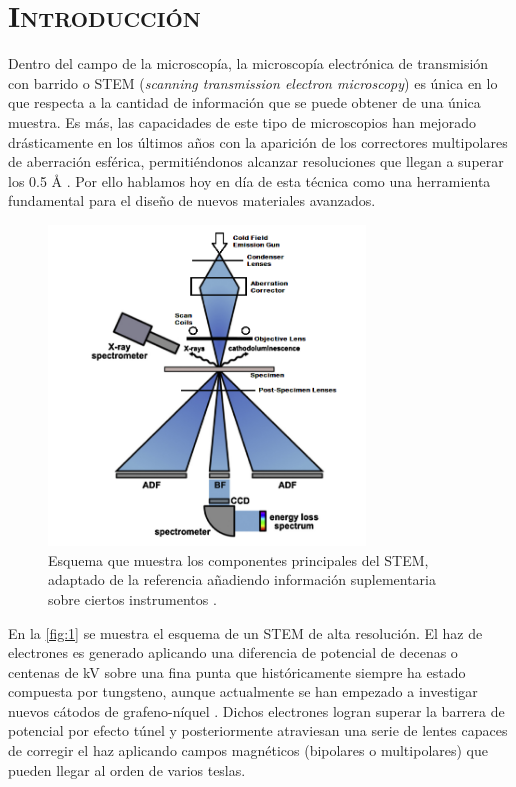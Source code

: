 \section*{\centering\scshape\Huge Introducción}
 \normalsize

Dentro del campo de la microscopía, la microscopía electrónica de transmisión con barrido o STEM (\textit{scanning transmission electron microscopy}) es única en lo que respecta a la cantidad de información que se puede obtener de una única muestra. Es más, las capacidades de este tipo de microscopios han mejorado drásticamente en los últimos años con la aparición de los correctores multipolares de aberración esférica, permitiéndonos alcanzar resoluciones que llegan a superar los 0.5 Å \cite{STEM_basics}. Por ello hablamos hoy en día de esta técnica como una herramienta fundamental para el diseño de nuevos materiales avanzados.\\

\begin{figure}[h!]
    \centering
    \includegraphics[width=0.75\textwidth]{fig/Fig1.png}
    \caption{Esquema que muestra los componentes principales del STEM, adaptado de la referencia \cite{foto_intro} añadiendo información suplementaria sobre ciertos instrumentos \cite{maria}.}
    \label{fig:1}
\end{figure}

En la \autoref{fig:1} se muestra el esquema de un STEM de alta resolución. El haz de electrones es generado aplicando una diferencia de potencial de decenas o centenas de kV sobre una fina punta que históricamente siempre ha estado compuesta por tungsteno, aunque actualmente se han empezado a investigar nuevos cátodos de grafeno-níquel \cite{e_gun}. Dichos electrones logran superar la barrera de potencial por efecto túnel y posteriormente atraviesan una serie de lentes capaces de corregir el haz aplicando campos magnéticos (bipolares o multipolares) que pueden llegar al orden de varios teslas.\\

